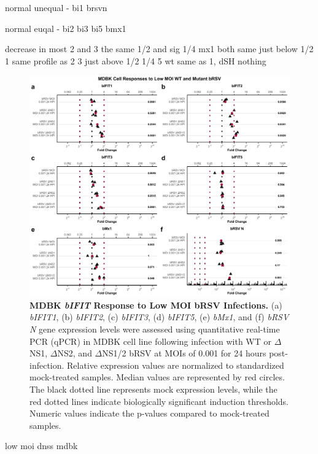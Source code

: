 normal unequal - bi1 brsvn

normal euqal - bi2 bi3 bi5 bmx1

decrease in most
2 and 3 the same
1/2 and sig 1/4
mx1 both same just below 1/2
1 same profile as 2 3 
    just above 1/2 1/4
5 wt same as 1, dSH nothing


\begin{figure}
    \centering
    \includegraphics[width=1\linewidth]{07. Chapter 2/Figs/02. Induction/06. mdbk_brsv_low_moi.pdf}
    \caption[MDBK \textit{bIFIT} Response to Low MOI bRSV Infections.]{\textbf{MDBK \textit{bIFIT} Response to Low MOI bRSV Infections.} (a) \textit{bIFIT1}, (b) \textit{bIFIT2}, (c) \textit{bIFIT3}, (d) \textit{bIFIT5}, (e) \textit{bMx1}, and (f) \textit{bRSV N} gene expression levels were assessed using quantitative real-time PCR (qPCR) in MDBK cell line following infection with WT or \(\Delta\)NS1, \(\Delta\)NS2, and \(\Delta\)NS1/2 bRSV at MOIs of 0.001 for 24 hours post-infection. Relative expression values are normalized to standardized mock-treated samples. Median values are represented by red circles. The black dotted line represents mock expression levels, while the red dotted lines indicate biologically significant induction thresholds. Numeric values indicate the p-values compared to mock-treated samples.}
    \label{fig:MDBK responses to low MOI mutant bRSV}
\end{figure}

low moi dnss mdbk

